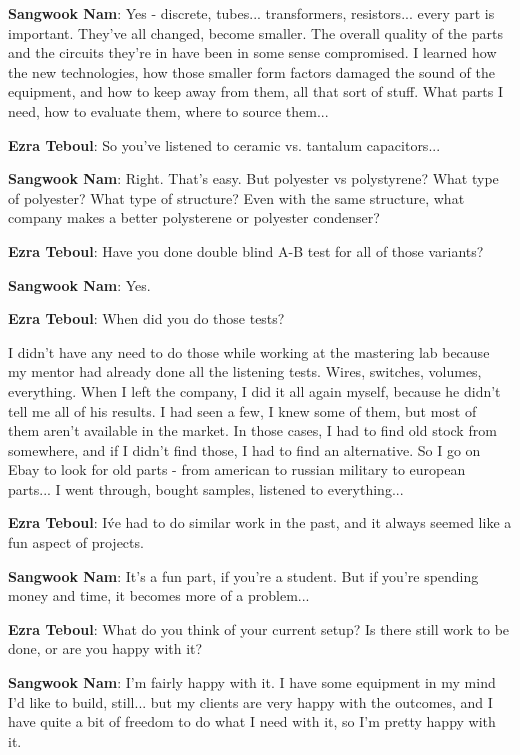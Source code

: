 \textbf{Sangwook Nam}: Yes - discrete, tubes... transformers, resistors... every part is important. They've all changed, become smaller. The overall quality of the parts and the circuits they're in have been in some sense compromised. I learned how the new technologies, how those smaller form factors damaged the sound of the equipment, and how to keep away from them, all that sort of stuff. What parts I need, how to evaluate them, where to source them...

\textbf{Ezra Teboul}: So you've listened to ceramic vs. tantalum capacitors...

\textbf{Sangwook Nam}: Right. That's easy. But polyester vs polystyrene? What type of polyester? What type of structure? Even with the same structure, what company makes a better polysterene or polyester condenser?

\textbf{Ezra Teboul}: Have you done double blind A-B test for all of those variants?

\textbf{Sangwook Nam}: Yes.

\textbf{Ezra Teboul}: When did you do those tests?

I didn't have any need to do those while working at the mastering lab because my mentor had already done all the listening tests. Wires, switches, volumes, everything. When I left the company, I did it all again myself, because he didn't tell me all of his results. I had seen a few, I knew some of them, but most of them aren't available in the market. In those cases, I had to find old stock from somewhere, and if I didn't find those, I had to find an alternative. So I go on Ebay to look for old parts - from american to russian military to european parts... I went through, bought samples, listened to everything...

\textbf{Ezra Teboul}: I\'ve had to do similar work in the past, and it always seemed like a fun aspect of projects.

\textbf{Sangwook Nam}: It's a fun part, if you're a student. But if you're spending money and time, it becomes more of a problem...

\textbf{Ezra Teboul}: What do you think of your current setup? Is there still work to be done, or are you happy with it?

\textbf{Sangwook Nam}: I'm fairly happy with it. I have some equipment in my mind I'd like to build, still... but my clients are very happy with the outcomes, and I have quite a bit of freedom to do what I need with it, so I'm pretty happy with it.


